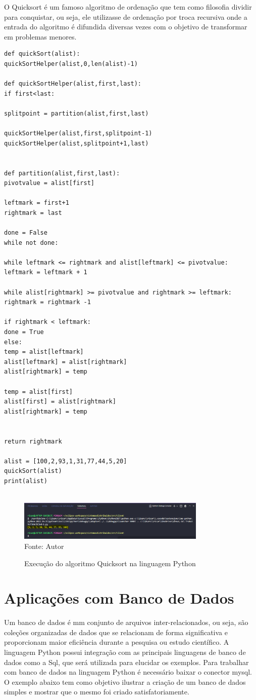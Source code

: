 O Quicksort é um famoso algoritmo de ordenação que tem como filosofia dividir para conquistar, ou seja, ele utilizasse de ordenação por troca recursiva onde a entrada do algoritmo é difundida diversas vezes com o objetivo de transformar em problemas menores.

\begin{lstlisting}
def quickSort(alist):
quickSortHelper(alist,0,len(alist)-1)

def quickSortHelper(alist,first,last):
if first<last:

splitpoint = partition(alist,first,last)

quickSortHelper(alist,first,splitpoint-1)
quickSortHelper(alist,splitpoint+1,last)


def partition(alist,first,last):
pivotvalue = alist[first]

leftmark = first+1
rightmark = last

done = False
while not done:

while leftmark <= rightmark and alist[leftmark] <= pivotvalue:
leftmark = leftmark + 1

while alist[rightmark] >= pivotvalue and rightmark >= leftmark:
rightmark = rightmark -1

if rightmark < leftmark:
done = True
else:
temp = alist[leftmark]
alist[leftmark] = alist[rightmark]
alist[rightmark] = temp

temp = alist[first]
alist[first] = alist[rightmark]
alist[rightmark] = temp


return rightmark

alist = [100,2,93,1,31,77,44,5,20]
quickSort(alist)
print(alist)
	
\end{lstlisting}

\begin{figure}[H]
	\begin{center}
		\caption{Execução do algoritmo Quicksort na linguagem Python} \label{ling1}
		\includegraphics[width=9cm]{quicksort.PNG} \\
		{\tiny \sf Fonte:{ Autor}}
	\end{center}
\end{figure}

    \section{Aplica\c{c}\~{o}es com Banco de Dados}
Um banco de dados é mm conjunto de arquivos inter-relacionados, ou seja, são coleções organizadas de dados que se relacionam de forma significativa e proporcionam maior eficiência durante a pesquisa ou estudo científico. A linguagem Python possui integração com as principais linguagens de banco de dados como a Sql, que será utilizada para elucidar os exemplos. Para trabalhar com banco de dados na linguagem Python é necessário baixar o conector mysql. O exemplo abaixo tem como objetivo ilustrar a criação de um banco de dados simples e mostrar que o mesmo foi criado satisfatoriamente.

